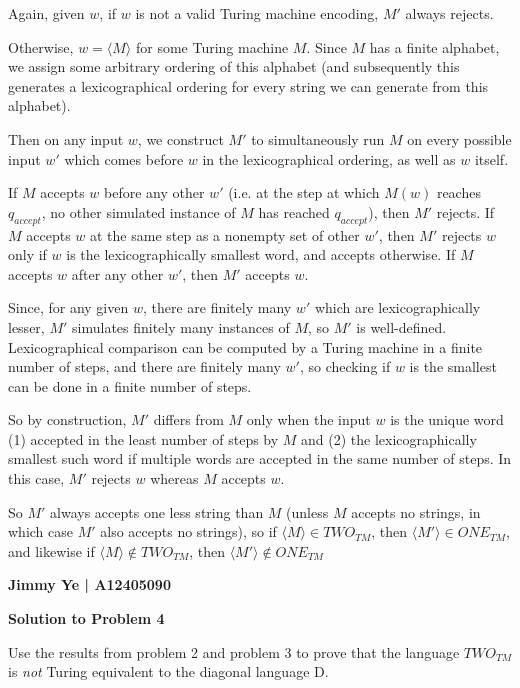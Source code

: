 \documentclass[letterpaper,12pt]{article}
\begin{document}
Again, given $w$, if $w$ is not a valid Turing machine encoding, $M'$ always rejects.

Otherwise, $w = \langle M \rangle$ for some Turing machine $M$. Since $M$ has a finite alphabet, we assign some arbitrary ordering of this alphabet (and subsequently this generates a lexicographical ordering for every string we can generate from this alphabet).

Then on any input $w$, we construct $M'$ to simultaneously run $M$ on every possible input $w'$ which comes before $w$ in the lexicographical ordering, as well as $w$ itself.

If $M$ accepts $w$ before any other $w'$ (i.e. at the step at which $M(w)$ reaches $q_{accept}$, no other simulated instance of $M$ has reached $q_{accept}$), then $M'$ rejects. If $M$ accepts $w$ at the same step as a nonempty set of other $w'$, then $M'$ rejects $w$ only if $w$ is the lexicographically smallest word, and accepts otherwise. If $M$ accepts $w$ after any other $w'$, then $M'$ accepts $w$.

Since, for any given $w$, there are finitely many $w'$ which are lexicographically lesser, $M'$ simulates finitely many instances of $M$, so $M'$ is well-defined. Lexicographical comparison can be computed by a Turing machine in a finite number of steps, and there are finitely many $w'$, so checking if $w$ is the smallest can be done in a finite number of steps.

So by construction, $M'$ differs from $M$ only when the input $w$ is the unique word (1) accepted in the least number of steps by $M$ and (2) the lexicographically smallest such word if multiple words are accepted in the same number of steps. In this case, $M'$ rejects $w$ whereas $M$ accepts $w$.

So $M'$ always accepts one less string than $M$ (unless $M$ accepts no strings, in which case $M'$ also accepts no strings), so if $\langle M \rangle \in TWO_{TM}$, then $\langle M' \rangle \in ONE_{TM}$, and likewise if $\langle M \rangle \notin TWO_{TM}$, then $\langle M' \rangle \notin ONE_{TM}$

\pagebreak

\noindent\textbf{Jimmy Ye | A12405090}

\noindent\textbf{Solution to Problem 4}

Use the results from problem 2 and problem 3 to prove that the language $TWO_{TM}$ is \textit{not} Turing equivalent to the diagonal language D.

\vspace{3mm}
\end{document}
